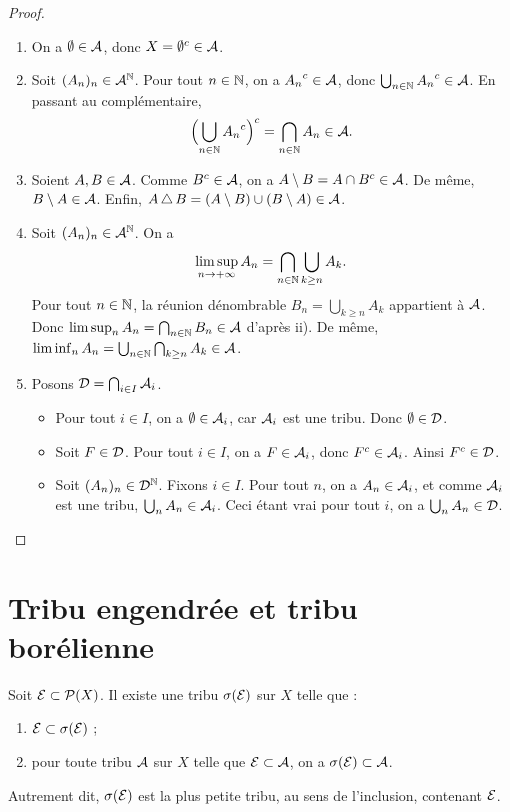 \documentclass[11pt]{article}
\begin{document}
\begin{proof}
\begin{enumerate}[label=\roman*)]
  \item On a $\emptyset \in \mathcal{A}$, donc $X = {\emptyset}^{c} \in \mathcal{A}$.
  \item Soit $(A_n)_{n} \in \mathcal{A}^{\mathbb{N}}$. Pour tout $n \in \mathbb{N}$, on a ${A_n}^{c} \in \mathcal{A}$, donc $\bigcup_{n\in\mathbb{N}} {A_n}^{c} \in \mathcal{A}$. En passant au complémentaire,
  \[
    \Bigl(\bigcup_{n\in\mathbb{N}} {A_n}^{c}\Bigr)^{c} = \bigcap_{n\in\mathbb{N}} A_n \in \mathcal{A}.
  \]
  \item Soient $A, B \in \mathcal{A}$. Comme ${B}^{c} \in \mathcal{A}$, on a $A \setminus B = A \cap {B}^{c} \in \mathcal{A}$. De même, $B \setminus A \in \mathcal{A}$. Enfin, $A \,\triangle\, B = (A \setminus B) \cup (B \setminus A) \in \mathcal{A}$.
  \item Soit $(A_n)_n \in \mathcal{A}^{\mathbb{N}}$. On a
  \[
    \limsup_{n\to+\infty} A_n = \bigcap_{n\in\mathbb{N}}\bigcup_{k\geq n} A_k.
  \]
  Pour tout $n\in\mathbb{N}$, la réunion dénombrable $B_n = \bigcup_{k\geq n} A_k$ appartient à $\mathcal{A}$. Donc $\limsup_n A_n = \bigcap_{n\in\mathbb{N}} B_n \in \mathcal{A}$ d'après ii). De même, $\liminf_n A_n = \bigcup_{n\in\mathbb{N}}\bigcap_{k\geq n} A_k \in \mathcal{A}$.
  \item Posons $\mathcal{D} = \bigcap_{i\in I}\mathcal{A}_i$.
  \begin{itemize}
    \item Pour tout $i \in I$, on a $\emptyset \in \mathcal{A}_i$, car $\mathcal{A}_i$ est une tribu. Donc $\emptyset \in \mathcal{D}$.
    \item Soit $F \in \mathcal{D}$. Pour tout $i \in I$, on a $F \in \mathcal{A}_i$, donc ${F}^{c} \in \mathcal{A}_i$. Ainsi ${F}^{c} \in \mathcal{D}$.
    \item Soit $(A_n)_n \in \mathcal{D}^{\mathbb{N}}$. Fixons $i \in I$. Pour tout $n$, on a $A_n \in \mathcal{A}_i$, et comme $\mathcal{A}_i$ est une tribu, $\bigcup_{n} A_n \in \mathcal{A}_i$. Ceci étant vrai pour tout $i$, on a $\bigcup_n A_n \in \mathcal{D}$. \qedhere
  \end{itemize}
\end{enumerate}
\end{proof}

\section{Tribu engendrée et tribu borélienne}

\begin{proposition}\label{prop:engendree}
Soit $\mathcal{E} \subset \mathcal{P}(X)$. Il existe une tribu $\sigma(\mathcal{E})$ sur $X$ telle que :
\begin{enumerate}[label=\roman*)]
  \item $\mathcal{E} \subset \sigma(\mathcal{E})$ ;
  \item pour toute tribu $\mathcal{A}$ sur $X$ telle que $\mathcal{E} \subset \mathcal{A}$, on a $\sigma(\mathcal{E}) \subset \mathcal{A}$.
\end{enumerate}
Autrement dit, $\sigma(\mathcal{E})$ est la plus petite tribu, au sens de l'inclusion, contenant $\mathcal{E}$.
\end{proposition}
\end{document}
